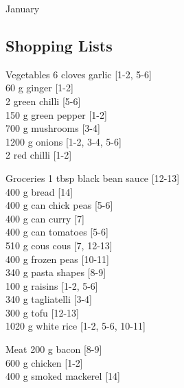 \begin{menu}{January}
    \subsection*{Shopping Lists}
      \begin{shoppinglist}{Vegetables}
      6 cloves garlic {\scriptsize[1-2, 5-6]}\\
      60 g ginger {\scriptsize[1-2]}\\
      2  green chilli {\scriptsize[5-6]}\\
      150 g green pepper {\scriptsize[1-2]}\\
      700 g mushrooms {\scriptsize[3-4]}\\
      1200 g onions {\scriptsize[1-2, 3-4, 5-6]}\\
      2  red chilli {\scriptsize[1-2]}\\
      \end{shoppinglist}%
      \begin{shoppinglist}{Groceries}
      1 tbsp black bean sauce {\scriptsize[12-13]}\\
      400 g bread {\scriptsize[14]}\\
      400 g can chick peas {\scriptsize[5-6]}\\
      400 g can curry {\scriptsize[7]}\\
      400 g can tomatoes {\scriptsize[5-6]}\\
      510 g cous cous {\scriptsize[7, 12-13]}\\
      400 g frozen peas {\scriptsize[10-11]}\\
      340 g pasta shapes {\scriptsize[8-9]}\\
      100 g raisins {\scriptsize[1-2, 5-6]}\\
      340 g tagliatelli {\scriptsize[3-4]}\\
      300 g tofu {\scriptsize[12-13]}\\
      1020 g white rice {\scriptsize[1-2, 5-6, 10-11]}\\
      \end{shoppinglist}%
      \par\vfil %
      \begin{shoppinglist}{Meat}
      200 g bacon {\scriptsize[8-9]}\\
      600 g chicken {\scriptsize[1-2]}\\
      400 g smoked mackerel {\scriptsize[14]}\\
      \end{shoppinglist}%

\end{menu}
